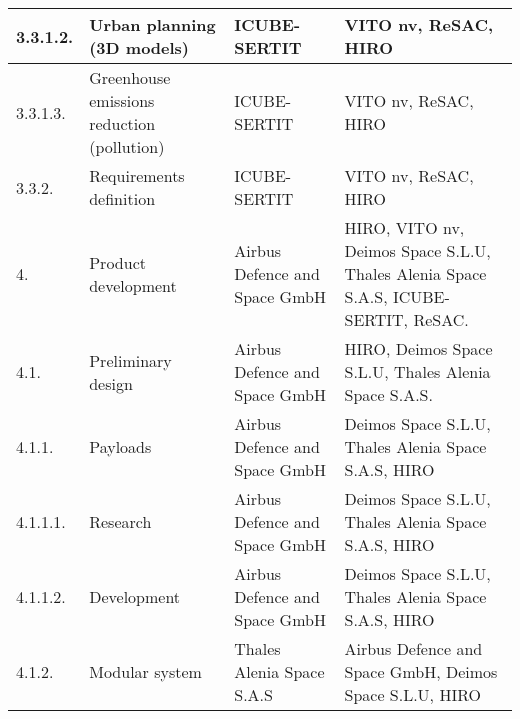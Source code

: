 \begin{longtable}[H]{p{1.5cm} >{\raggedright\arraybackslash}p{4cm} >{\raggedright\arraybackslash}p{3.8cm} >{\raggedright\arraybackslash}p{4cm}}
	\midrule
	
	3.3.1.2. & Urban planning (3D models) & ICUBE-SERTIT & VITO nv, ReSAC, HIRO\vspace{0.2cm} \\
	
	\midrule
	
	3.3.1.3. & Greenhouse emissions reduction (pollution) & ICUBE-SERTIT & VITO nv, ReSAC, HIRO\vspace{0.2cm} \\
	
	\midrule
	
	3.3.2. & Requirements definition & ICUBE-SERTIT & VITO nv, ReSAC, HIRO\vspace{0.2cm} \\
	
	\midrule
	
	4. & Product development & Airbus Defence and Space GmbH & HIRO, VITO nv, Deimos Space S.L.U, Thales Alenia Space S.A.S, ICUBE-SERTIT, ReSAC.\vspace{0.2cm} \\
	
	\midrule
	
	4.1. & Preliminary design & Airbus Defence and Space GmbH & HIRO, Deimos Space S.L.U, Thales Alenia Space S.A.S.\vspace{0.2cm} \\
	
	\midrule
	
	4.1.1. & Payloads & Airbus Defence and Space GmbH & Deimos Space S.L.U, Thales Alenia Space S.A.S, HIRO\vspace{0.2cm} \\
	
	\midrule
	
	4.1.1.1. & Research & Airbus Defence and Space GmbH & Deimos Space S.L.U, Thales Alenia Space S.A.S, HIRO\vspace{0.2cm} \\
	
	\midrule
	
	4.1.1.2. & Development & Airbus Defence and Space GmbH & Deimos Space S.L.U, Thales Alenia Space S.A.S, HIRO\vspace{0.2cm} \\
	
	\midrule
	
	4.1.2. & Modular system & Thales Alenia Space S.A.S & Airbus Defence and Space GmbH, Deimos Space S.L.U, HIRO\vspace{0.2cm} \\
	

\end{longtable}
